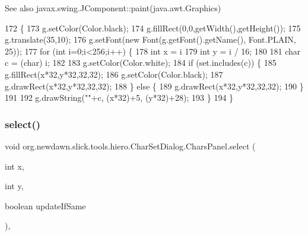 \begin{DoxySeeAlso}{See also}
javax.\+swing.\+J\+Component\+::paint(java.\+awt.\+Graphics) 
\end{DoxySeeAlso}

\begin{DoxyCode}
172                                       \{
173             g.setColor(Color.black);
174             g.fillRect(0,0,getWidth(),getHeight());
175             g.translate(35,10);
176             g.setFont(\textcolor{keyword}{new} Font(g.getFont().getName(), Font.PLAIN, 25));
177             \textcolor{keywordflow}{for} (\textcolor{keywordtype}{int} i=0;i<256;i++) \{
178                 \textcolor{keywordtype}{int} x = i %
179                 \textcolor{keywordtype}{int} y = i / 16;
180                 
181                 \textcolor{keywordtype}{char} c = (char) i;
182 
183                 g.setColor(Color.white);
184                 \textcolor{keywordflow}{if} (\textcolor{keyword}{set}.includes(c)) \{
185                     g.fillRect(x*32,y*32,32,32);
186                     g.setColor(Color.black);
187                     g.drawRect(x*32,y*32,32,32);
188                 \} \textcolor{keywordflow}{else} \{
189                     g.drawRect(x*32,y*32,32,32);
190                 \}
191                 
192                 g.drawString(\textcolor{stringliteral}{""}+c, (x*32)+5, (y*32)+28);
193             \}
194         \}
\end{DoxyCode}
\mbox{\label{classorg_1_1newdawn_1_1slick_1_1tools_1_1hiero_1_1_char_set_dialog_1_1_chars_panel_a57f075b0851428a9a7ac6ff46c8013f9}} 
\subsubsection{\texorpdfstring{select()}{select()}}
{\footnotesize\ttfamily void org.\+newdawn.\+slick.\+tools.\+hiero.\+Char\+Set\+Dialog.\+Chars\+Panel.\+select (\begin{DoxyParamCaption}\item[{int}]{x,  }\item[{int}]{y,  }\item[{boolean}]{update\+If\+Same }\end{DoxyParamCaption})\hspace{0.3cm}{\ttfamily [inline]}, {\ttfamily [private]}}

